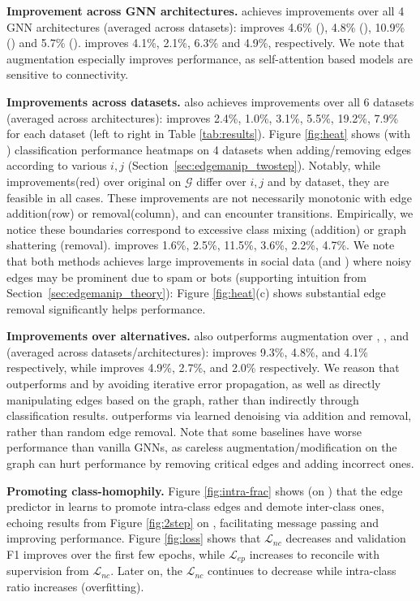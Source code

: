 \documentclass[letterpaper]{article} \usepackage{aaai21}  \usepackage{times}  \usepackage{helvet} \usepackage{courier}  \usepackage[hyphens]{url}  \usepackage{graphicx} \urlstyle{rm} \def\UrlFont{\rm}  \usepackage{natbib}  \usepackage{caption} \frenchspacing  \setlength{\pdfpagewidth}{8.5in}  \setlength{\pdfpageheight}{11in}
\begin{document}
\noindent \textbf{Improvement across GNN architectures.} \methodshared achieves improvements over all 4 GNN architectures (averaged across datasets): \methodtwo improves 4.6\% (\gcn),  4.8\% (\gsage), 10.9\% (\gat) and 5.7\% (\jknet). \method improves 4.1\%, 2.1\%, 6.3\% and 4.9\%, respectively.  We note that augmentation especially improves \gat performance, as self-attention based models are sensitive to connectivity.

\noindent \textbf{Improvements across datasets.} \methodshared also achieves improvements over all 6 datasets (averaged across architectures): \methodtwo improves 2.4\%, 1.0\%, 3.1\%, 5.5\%, 19.2\%, 7.9\% for each dataset (left to right in Table \ref{tab:results}).  Figure \ref{fig:heat} shows \methodtwo (with \gcn) classification performance heatmaps on 4 datasets when adding/removing edges according to various $i,j$ (Section~\ref{sec:edgemanip_twostep}).  Notably, while improvements(red) over original \gcn on $\mathcal{G}$ differ over $i,j$ and by dataset, they are feasible in all cases. These improvements are not necessarily monotonic with edge addition(row) or removal(column), and can encounter transitions.  Empirically, we notice these boundaries correspond to excessive class mixing (addition) or graph shattering (removal).  \method improves 1.6\%, 2.5\%, 11.5\%, 3.6\%, 2.2\%, 4.7\%.  We note that both methods achieves large improvements in social data (\blogc and \flickr) where noisy edges may be prominent due to spam or bots (supporting intuition from Section~\ref{sec:edgemanip_theory}): Figure \ref{fig:heat}(c) shows substantial edge removal significantly helps performance.


\noindent \textbf{Improvements over alternatives.} \methodshared also outperforms augmentation over \bgcn, \adaedge, and \dropedge (averaged across datasets/architectures): \methodtwo improves 9.3\%, 4.8\%, and 4.1\% respectively, while \method improves 4.9\%, 2.7\%, and 2.0\% respectively. We reason that \methodtwo outperforms \bgcn and \adaedge by avoiding iterative error propagation, as well as directly manipulating edges based on the graph, rather than indirectly through classification results. \method outperforms \dropedge via learned denoising via addition and removal, rather than random edge removal. Note that some baselines have worse performance than vanilla GNNs, as careless augmentation/modification on the graph can hurt performance by removing critical edges and adding incorrect ones. 

\noindent \textbf{Promoting class-homophily.} Figure \ref{fig:intra-frac} shows (on \cora) that the edge predictor in \method learns to promote intra-class edges and demote inter-class ones, echoing results from Figure \ref{fig:2step} on \methodtwo, facilitating message passing and improving performance.  Figure \ref{fig:loss} shows that $\mathcal{L}_{nc}$ decreases and validation F1 improves over the first few epochs, while $\mathcal{L}_{ep}$ increases to reconcile with supervision from $\mathcal{L}_{nc}$.  Later on, the $\mathcal{L}_{nc}$ continues to decrease while intra-class ratio increases (overfitting).
\end{document}
